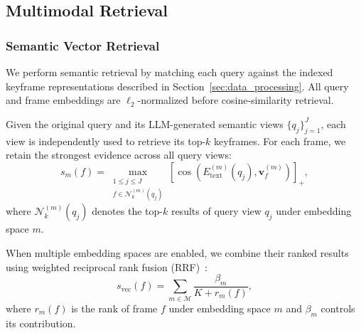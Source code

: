 \documentclass[runningheads]{llncs}
\begin{document}
\subsection{Multimodal Retrieval}
\subsubsection{Semantic Vector Retrieval}

We perform semantic retrieval by matching each query against the indexed
keyframe representations described in Section~\ref{sec:data_processing}.
All query and frame embeddings are $\ell_2$-normalized before
cosine-similarity retrieval.

Given the original query and its LLM-generated semantic views
$\{q_j\}_{j=1}^{J}$, each view is independently used to retrieve its
top-$k$ keyframes. For each frame, we retain the strongest evidence
across all query views:
\begin{equation}
s_m(f)=
\max_{\substack{
1\leq j\leq J\\
f\in\mathcal{N}^{(m)}_k(q_j)
}}
\left[
\cos\!\left(
E^{(m)}_{\mathrm{text}}(q_j),
\mathbf{v}^{(m)}_f
\right)
\right]_{+},
\end{equation}
where $\mathcal{N}^{(m)}_k(q_j)$ denotes the top-$k$ results of query
view $q_j$ under embedding space $m$.

When multiple embedding spaces are enabled, we combine their ranked
results using weighted reciprocal rank fusion (RRF)~\cite{cormack2009rrf}:
\begin{equation}
s_{\mathrm{vec}}(f)=
\sum_{m\in\mathcal{M}}
\frac{\beta_m}{K+r_m(f)},
\end{equation}
where $r_m(f)$ is the rank of frame $f$ under embedding space $m$ and
$\beta_m$ controls its contribution.

\end{document}
